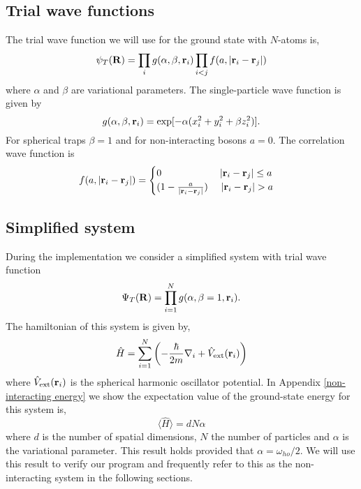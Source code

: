 \documentclass[a4paper,10pt]{article}
\begin{document}
\subsection{Trial wave functions}
The trial wave function we will use for the ground state with $N$-atoms is,
\begin{equation}
 \psi_T({\bf R}) = \prod_i g(\alpha,\beta,{\bf r}_i) \prod_{i < j} f(a,|{\bf r}_i - {\bf r}_j|) \label{Full trial wave function}
\end{equation}
where $\alpha$ and $\beta$ are variational parameters. The single-particle wave function is given by
\begin{equation}
 g(\alpha,\beta,{\bf r}_i) = \exp[-\alpha(x_i^2 + y_i^2 + \beta z_i^2)].
\end{equation}
For spherical traps $\beta = 1$ and for non-interacting bosons $a=0$. The correlation wave function is
\begin{equation}
 f(a,|{\bf r}_i - {\bf r}_j|) = 
 \begin{cases}
  0 \ \ \ \ \ \ \ \ \ \ \ \ \ \ \ \ \ \ |{\bf r}_i - {\bf r}_j| \leq a \\
  (1-\frac{a}{|{\bf r}_i - {\bf r}_j|}) \ \ \ \ |{\bf r}_i - {\bf r}_j| > a
 \end{cases}
\end{equation}
\subsection{Simplified system} \label{simple system}
During the implementation we consider a simplified system with trial wave function
\begin{equation}
 \Psi_T({\bf R}) = \prod_{i=1}^N g(\alpha,\beta=1,{\bf r}_i). \label{Simple trial wave function}
\end{equation}
The hamiltonian of this system is given by,
\begin{equation}
 \hat{H} = \sum_{i=1}^N \left( -\frac{\hbar}{2m} \nabla_i + \hat{V}_{\text{ext}}({\bf r}_i) \right)
\end{equation}
where $\hat{V}_{\text{ext}}({\bf r}_i)$ is the spherical harmonic oscillator potential. In Appendix \ref{non-interacting energy} we show
the expectation value of the ground-state energy for this system is,
\begin{equation}
 \langle \hat{H} \rangle = dN\alpha \label{exact energy}
\end{equation}
where $d$ is the number of spatial dimensions, $N$ the number of particles and $\alpha$ is the variational parameter.
This result holds provided that $\alpha = \omega_{ho}/2$. We will use this result to verify our program and frequently
refer to this as the non-interacting system in the following sections.
\end{document}
